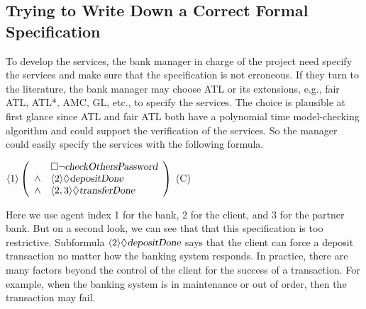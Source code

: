 \subsection{Trying to Write Down a Correct Formal Specification}
To develop the services, the bank manager in charge of the project need specify the services and make sure that the specification is not erroneous.
If they turn to the literature, the bank manager may choose ATL or its extensions, e.g., fair ATL, ATL*, AMC, GL, etc., to specify the services. 
The choice is plausible at first glance since ATL and fair ATL both have a polynomial time model-checking algorithm and could support the verification of the services.
So the manager could easily specify the services with the following formula. 
\begin{center} \hfill 
$\langle 1\rangle\left(\begin{array}{cl}
		& \Box\neg \mbox{\sl checkOthersPassword}\\
\wedge 	& \langle 2\rangle \Diamond \mbox{\sl depositDone} \\
\wedge  & \langle 2, 3\rangle\Diamond\mbox{\sl transferDone} 
\end{array}\right)$
\hfill (C) 
\end{center}   
Here we use agent index 1 for the bank, 2 for the client, and 3 for the partner bank.
But on a second look, we can see that that this specification is too restrictive.  
Subformula $\langle 2\rangle\Diamond \mbox{\sl depositDone}$ says that the client can force a deposit transaction no matter how the banking system responds. 
In practice, there are many factors beyond the control of the client for the success of a transaction.  
For example, when the banking system is in maintenance or out of order, then the transaction may fail.  

